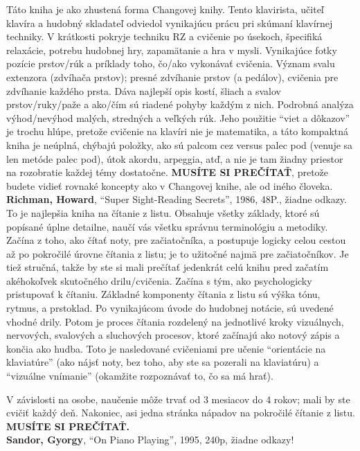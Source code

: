 \documentclass[11pt,a4paper]{book}
\begin{document}
Táto kniha je ako zhustená forma Changovej knihy. Tento klavirista, učiteľ klavíra a hudobný skladateľ odviedol vynikajúcu prácu pri skúmaní klavírnej techniky. V krátkosti pokryje techniku RZ a cvičenie po úsekoch, špecifiká relaxácie, potrebu hudobnej hry, zapamätanie a hra v mysli. Vynikajúce fotky pozície prstov/rúk a príklady toho, čo/ako vykonávať cvičenia. Význam svalu extenzora (zdvíhača prstov); presné zdvíhanie prstov (a pedálov), cvičenia pre zdvíhanie každého prsta. Dáva najlepší opis kostí, šliach a svalov prstov/ruky/paže a ako/čím   sú riadené pohyby každým z nich. Podrobná analýza výhod/nevýhod malých, stredných a veľkých rúk. Jeho použitie “viet a dôkazov” je trochu hlúpe, pretože cvičenie na klavíri nie je matematika, a táto kompaktná kniha je neúplná, chýbajú položky, ako sú palcom cez versus palec pod (venuje sa len metóde palec pod), útok akordu, arpeggia, atď, a nie je tam žiadny priestor na rozobratie každej témy dostatočne. \textbf{MUSÍTE SI PREČÍTAŤ}, pretože budete vidieť rovnaké koncepty ako v Changovej knihe, ale od iného človeka.
\medskip\\
\textbf{Richman, Howard}, “Super Sight-Reading Secrets”, 1986, 48P., žiadne odkazy. To je najlepšia kniha na čítanie z listu. Obsahuje všetky základy, ktoré sú popísané úplne detailne, naučí vás všetku správnu terminológiu a metodiky. Začína z toho, ako čítať noty, pre začiatočníka, a postupuje logicky celou cestou až po pokročilé úrovne čítania z listu; je to užitočné najmä pre začiatočníkov. Je tiež stručná, takže by ste si mali prečítať jedenkrát celú knihu pred začatím akéhokoľvek skutočného drilu/cvičenia. Začína s tým, ako psychologicky pristupovať k čítaniu. Základné komponenty čítania z listu sú výška tónu, rytmus, a prstoklad. Po vynikajúcom úvode do hudobnej notácie, sú uvedené vhodné drily. Potom je proces čítania rozdelený na jednotlivé kroky vizuálnych, nervových, svalových a sluchových procesov, ktoré začínajú ako notový zápis a končia ako hudba. Toto je nasledované cvičeniami pre učenie “orientácie na klaviatúre” (ako nájsť noty, bez toho, aby ste sa pozerali na klaviatúru) a “vizuálne vnímanie” (okamžite rozpoznávať to, čo sa má hrať). 

V závislosti na osobe, naučenie môže trvať od 3 mesiacov do 4 rokov; mali by ste cvičiť každý deň. Nakoniec, asi jedna stránka nápadov na pokročilé čítanie z listu. \textbf{MUSÍTE SI PREČÍTAŤ.}
\medskip\\
\textbf{\hypertarget{r:sandor}{Sandor, Gyorgy}}, “On Piano Playing”, 1995, 240p, žiadne odkazy!
\end{document}
